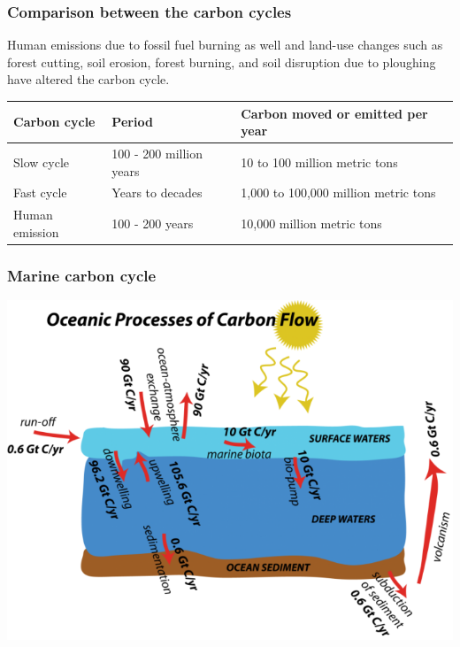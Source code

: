 \documentclass[11pt]{article}
\begin{document}
\subsubsection{Comparison between the carbon cycles}
\label{sec:orge6be570}
Human emissions due to fossil fuel burning as well and land-use changes such as forest cutting, soil erosion, forest burning, and soil disruption due to ploughing have altered the carbon cycle.
\begin{center}
\begin{tabular}{l|l|l}
\textbf{Carbon cycle} & \textbf{Period} & \textbf{Carbon moved or emitted per year}\\[0pt]
\hline
Slow cycle & 100 - 200 million years & 10 to 100 million metric tons\\[0pt]
Fast cycle & Years to decades & 1,000 to 100,000 million metric tons\\[0pt]
Human emission & 100 - 200 years & 10,000 million metric tons\\[0pt]
\end{tabular}
\end{center}

\subsubsection{Marine carbon cycle}
\label{sec:org2fc6517}
\begin{center}
\includegraphics[width=.9\linewidth]{./images/marine-carbon-cycle.png}
\end{center}

\newpage
\end{document}
